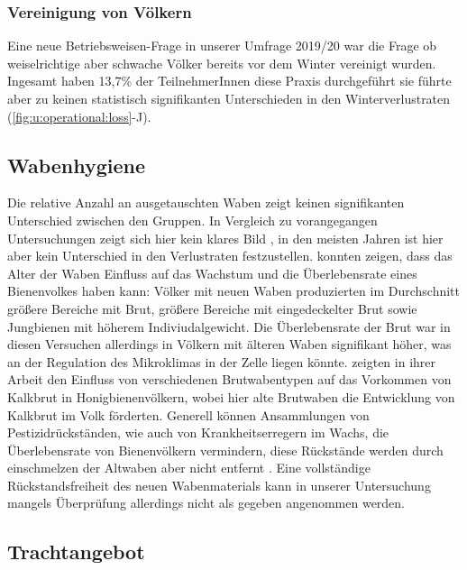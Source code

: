 \subsubsection{Vereinigung von Völkern}

Eine neue Betriebsweisen-Frage in unserer Umfrage 2019/20 war die Frage ob weiselrichtige aber schwache Völker bereits vor dem Winter vereinigt wurden. Ingesamt haben 13,7\% der TeilnehmerInnen diese Praxis durchgeführt sie führte aber zu keinen statistisch signifikanten Unterschieden in den Winterverlustraten (\cref{fig:u:operational:loss}-J).

\subsection{Wabenhygiene}

Die relative Anzahl an ausgetauschten Waben zeigt keinen signifikanten Unterschied zwischen den Gruppen. In Vergleich zu vorangegangen Untersuchungen zeigt sich hier kein klares Bild \citep{crailsheim2018, oberreiter2020}, in den meisten Jahren ist hier aber kein Unterschied in den Verlustraten festzustellen.
\newline
\cite{berry2001} konnten zeigen, dass das Alter der Waben Einfluss auf das Wachstum und die Überlebensrate eines Bienenvolkes haben kann: Völker mit neuen Waben produzierten im Durchschnitt größere Bereiche mit Brut, größere Bereiche mit eingedeckelter Brut sowie Jungbienen mit höherem Indiviudalgewicht. Die Überlebensrate der Brut war in diesen Versuchen allerdings in Völkern mit älteren Waben signifikant höher, was an der Regulation des Mikroklimas in der Zelle liegen könnte. \cite{koenig1986} zeigten in ihrer Arbeit den Einfluss von verschiedenen Brutwabentypen auf das Vorkommen von Kalkbrut in Honigbienenvölkern, wobei hier alte Brutwaben die Entwicklung von Kalkbrut im Volk förderten.
\newline
Generell können Ansammlungen von Pestizidrückständen, wie auch von Krankheitserregern im Wachs, die Überlebensrate von Bienenvölkern vermindern, diese Rückstände werden durch einschmelzen der Altwaben aber nicht entfernt \citep{calatayud-vernich2018}. Eine vollständige Rückstandsfreiheit des neuen Wabenmaterials kann in unserer Untersuchung mangels Überprüfung allerdings nicht als gegeben angenommen werden. 

\subsection{Trachtangebot}


